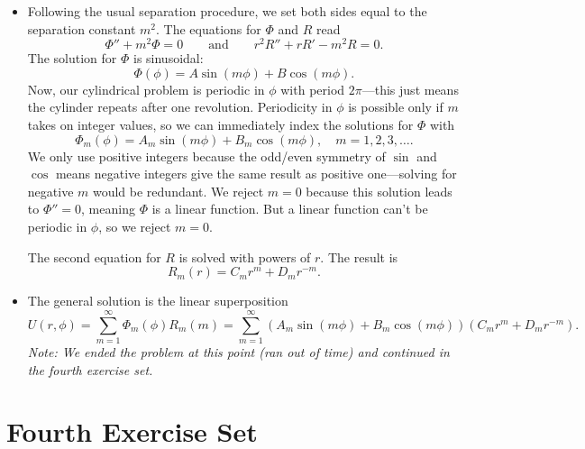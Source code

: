\documentclass[11pt, a4paper]{article}
\newcommand{\eqtext}[1]{\qquad \text{#1} \qquad}
\begin{document}
\begin{itemize}
	\item Following the usual separation procedure, we set both sides equal to the separation constant $ m^{2} $. The equations for $ \Phi $ and $ R $ read
	\begin{equation*}
		\Phi'' + m^{2} \Phi = 0 \eqtext{and} r^{2}R'' + rR' - m^{2}R = 0.
	\end{equation*}
	The solution for $ \Phi $ is sinusoidal:
	\begin{equation*}
		\Phi(\phi) = A \sin(m\phi) + B\cos(m\phi).
	\end{equation*}
	Now, our cylindrical problem is periodic in $ \phi $ with period $ 2\pi $---this just means the cylinder repeats after one revolution. Periodicity in $ \phi $ is possible only if $ m $ takes on integer values, so we can immediately index the solutions for $ \Phi $ with
	\begin{equation*}
		\Phi_{m}(\phi) = A_{m} \sin(m\phi) + B_{m}\cos(m\phi), \quad m = 1, 2, 3, \ldots .
	\end{equation*}
	We only use positive integers because the odd/even symmetry of $ \sin $ and $ \cos $ means negative integers give the same result as positive one---solving for negative $ m $ would be redundant. We reject $ m = 0 $ because this solution leads to $ \Phi'' = 0 $, meaning $ \Phi $ is a linear function. But a linear function can't be periodic in $ \phi $, so we reject $ m = 0 $.
	
	The second equation for $ R $ is solved with powers of $ r $. The result is
	\begin{equation*}
		R_{m}(r) = C_{m}r^{m} + D_{m}r^{-m}.
	\end{equation*}
	
	\item The general solution is the linear superposition
	\begin{equation*}
		U(r, \phi) = \sum_{m = 1}^{\infty}\Phi_{m}(\phi)R_{m}(m) = \sum_{m = 1}^{\infty} \left(A_{m} \sin(m\phi) + B_{m}\cos(m\phi)\right)\left( C_{m}r^{m} + D_{m}r^{-m} \right).
	\end{equation*}
	\textit{Note: We ended the problem at this point (ran out of time) and continued in the fourth exercise set.}

	\end{itemize}
	
\section{Fourth Exercise Set}
\end{document}
